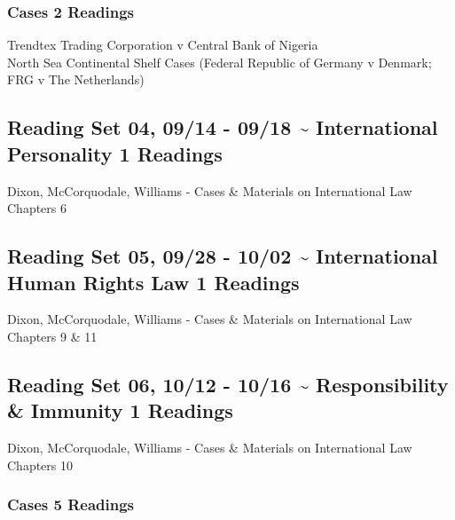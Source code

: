 \documentclass[10pt,]{article}
\begin{document}
\hypertarget{cases-2-readings}{%
\subsubsection{Cases \textbar{} 2 Readings}\label{cases-2-readings}}

Trendtex Trading Corporation v Central Bank of Nigeria\\
North Sea Continental Shelf Cases (Federal Republic of Germany v
Denmark; FRG v The Netherlands)

\hypertarget{reading-set-04-0914---0918-international-personality-1-readings}{%
\subsection{Reading Set 04, 09/14 - 09/18 \textasciitilde{}
International Personality \textbar{} 1
Readings}\label{reading-set-04-0914---0918-international-personality-1-readings}}

Dixon, McCorquodale, Williams - Cases \& Materials on International Law
Chapters 6

\hypertarget{reading-set-05-0928---1002-international-human-rights-law-1-readings}{%
\subsection{Reading Set 05, 09/28 - 10/02 \textasciitilde{}
International Human Rights Law \textbar{} 1
Readings}\label{reading-set-05-0928---1002-international-human-rights-law-1-readings}}

Dixon, McCorquodale, Williams - Cases \& Materials on International Law
Chapters 9 \& 11

\hypertarget{reading-set-06-1012---1016-responsibility-immunity-1-readings}{%
\subsection{Reading Set 06, 10/12 - 10/16 \textasciitilde{}
Responsibility \& Immunity \textbar{} 1
Readings}\label{reading-set-06-1012---1016-responsibility-immunity-1-readings}}

Dixon, McCorquodale, Williams - Cases \& Materials on International Law
Chapters 10

\hypertarget{cases-5-readings}{%
\subsubsection{Cases \textbar{} 5 Readings}\label{cases-5-readings}}
\end{document}
